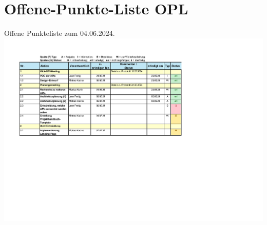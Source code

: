 \documentclass[12pt]{article}
\begin{document}
\section{Offene-Punkte-Liste OPL}
Offene Punkteliste zum 04.06.2024.
\newline
\includegraphics[width=\textwidth]{Planungsdokumente/graphics/Offene_Punkteliste.pdf}
\end{document}
